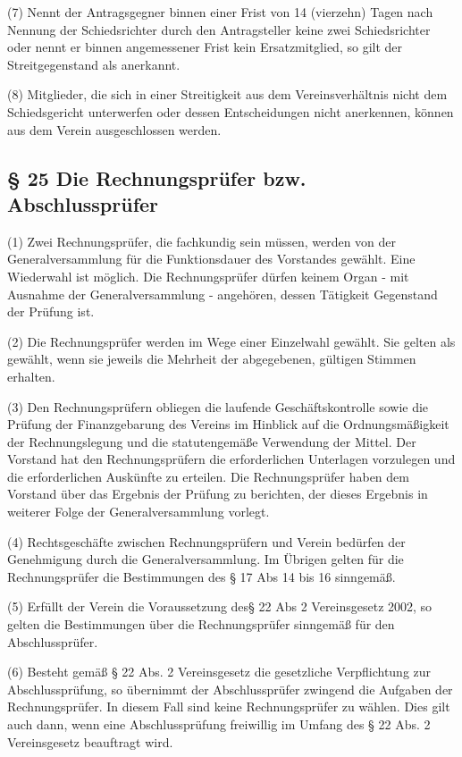 \documentclass[11pt,a4paper]{article}
\begin{document}
(7)
Nennt der Antragsgegner binnen einer Frist von 14 (vierzehn) Tagen nach Nennung der Schiedsrichter durch den Antragsteller keine zwei Schiedsrichter oder nennt er binnen angemessener Frist kein Ersatzmitglied, so gilt der Streitgegenstand als anerkannt.

(8)
Mitglieder, die sich in einer Streitigkeit aus dem Vereinsverhältnis nicht dem Schiedsgericht unterwerfen oder dessen Entscheidungen nicht anerkennen, können aus dem Verein ausgeschlossen werden.

\subsection{§ 25
Die Rechnungsprüfer bzw. Abschlussprüfer}

(1)
Zwei Rechnungsprüfer, die fachkundig sein müssen, werden von der Generalversammlung für die Funktionsdauer des Vorstandes gewählt.
Eine Wiederwahl ist möglich.
Die Rechnungsprüfer dürfen keinem Organ - mit Ausnahme der Generalversammlung - angehören, dessen Tätigkeit Gegenstand der Prüfung ist.

(2)
Die Rechnungsprüfer werden im Wege einer Einzelwahl gewählt.
Sie gelten als gewählt, wenn sie jeweils die Mehrheit der abgegebenen, gültigen Stimmen erhalten.

(3)
Den Rechnungsprüfern obliegen die laufende Geschäftskontrolle sowie die Prüfung der Finanzgebarung des Vereins im Hinblick auf die Ordnungsmäßigkeit der Rechnungslegung und die statutengemäße Verwendung der Mittel.
Der Vorstand hat den Rechnungsprüfern die erforderlichen Unterlagen vorzulegen und die erforderlichen Auskünfte zu erteilen.
Die Rechnungsprüfer haben dem Vorstand über das Ergebnis der Prüfung zu berichten, der dieses Ergebnis in weiterer Folge der Generalversammlung vorlegt.

(4)
Rechtsgeschäfte zwischen Rechnungsprüfern und Verein bedürfen der Genehmigung durch die Generalversammlung.
Im Übrigen gelten für die Rechnungsprüfer die Bestimmungen des § 17 Abs 14 bis 16 sinngemäß.

(5)
Erfüllt der Verein die Voraussetzung des§ 22 Abs 2 Vereinsgesetz 2002, so gelten die Bestimmungen über die Rechnungsprüfer sinngemäß für den Abschlussprüfer.

(6)
Besteht gemäß § 22 Abs. 2 Vereinsgesetz die gesetzliche Verpflichtung zur Abschlussprüfung, so übernimmt der Abschlussprüfer zwingend die Aufgaben der Rechnungsprüfer.
In diesem Fall sind keine Rechnungsprüfer zu wählen.
Dies gilt auch dann, wenn eine Abschlussprüfung freiwillig im Umfang des § 22 Abs. 2 Vereinsgesetz beauftragt wird.
\end{document}
